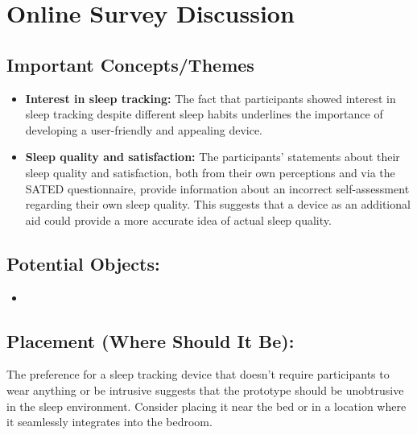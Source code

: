 \documentclass[
  a4paper,  %
  twoside,  %
  bibliography=totoc,
  headsepline,
  cleardoublepage=empty,
  parskip=half,
  draft=false
]{scrbook}
\begin{document}
\section{Online Survey Discussion}

\subsection{Important Concepts/Themes}
\begin{itemize}
    \item \textbf{Interest in sleep tracking:} The fact that participants showed interest in sleep tracking despite different sleep habits underlines the importance of developing a user-friendly and appealing device.
    \item \textbf{Sleep quality and satisfaction:} The participants' statements about their sleep quality and satisfaction, both from their own perceptions and via the SATED questionnaire, provide information about an incorrect self-assessment regarding their own sleep quality. This suggests that a device as an additional aid could provide a more accurate idea of actual sleep quality.
\end{itemize}

\subsection{Potential Objects:} 
\begin{itemize}
    \item 
\end{itemize}

\subsection{Placement (Where Should It Be):} 
The preference for a sleep tracking device that doesn't require participants to wear anything or be intrusive suggests that the prototype should be unobtrusive in the sleep environment. Consider placing it near the bed or in a location where it seamlessly integrates into the bedroom.
\end{document}

